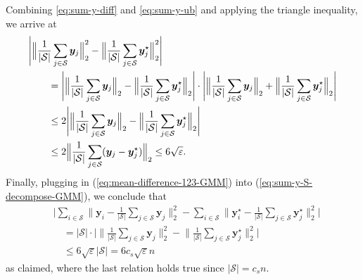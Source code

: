 %
Combining  \eqref{eq:sum-y-diff} and \eqref{eq:sum-y-ub} and applying the triangle inequality, we arrive at
%
\begin{align}
& \Bigg|\Big\|\frac{1}{|\mathcal{S}|}\sum_{j\in\mathcal{S}}\bm{y}_{j}\Big\|_{2}^{2}-\Big\|\frac{1}{|\mathcal{S}|}\sum_{j\in\mathcal{S}}\bm{y}_{j}^{\star}\Big\|_{2}^{2}\Bigg| \notag\\
& \qquad  =\Bigg|\Big\|\frac{1}{|\mathcal{S}|}\sum_{j\in\mathcal{S}}\bm{y}_{j}\Big\|_{2} -\Big\|\frac{1}{|\mathcal{S}|}\sum_{j\in\mathcal{S}}\bm{y}_{j}^{\star}\Big\|_{2} \Bigg|\cdot \Bigg|\Big\|\frac{1}{|\mathcal{S}|}\sum_{j\in\mathcal{S}}\bm{y}_{j}\Big\|_{2} + \Big\|\frac{1}{|\mathcal{S}|}\sum_{j\in\mathcal{S}}\bm{y}_{j}^{\star}\Big\|_{2} \Bigg| \notag\\
& \qquad \leq 2\Bigg|\Big\|\frac{1}{|\mathcal{S}|}\sum_{j\in\mathcal{S}}\bm{y}_{j}\Big\|_{2} -\Big\|\frac{1}{|\mathcal{S}|}\sum_{j\in\mathcal{S}}\bm{y}_{j}^{\star}\Big\|_{2} \Bigg| \notag \\
& \qquad \leq 2 \Big\|\frac{1}{|\mathcal{S}|}\sum_{j\in\mathcal{S}}(\bm{y}_{j}-\bm{y}_{j}^{\star})\Big\|_{2}
  \leq 6\sqrt{\varepsilon}.\label{eq:mean-difference-123-GMM}
\end{align}
Finally, plugging in (\ref{eq:mean-difference-123-GMM})
into (\ref{eq:sum-y-S-decompose-GMM}),
we conclude that
%
\begin{align*}
 & \Bigg| \sum_{i\in\mathcal{S}}\Big\|\bm{y}_{i}-\frac{1}{|\mathcal{S}|}\sum_{j\in\mathcal{S}}\bm{y}_{j}\Big\|_{2}^{2}-\sum_{i\in\mathcal{S}}\Big\|\bm{y}_{i}^{\star}-\frac{1}{|\mathcal{S}|}\sum_{j\in\mathcal{S}}\bm{y}_{j}^{\star}\Big\|_{2}^{2} \Bigg|\\
 & \quad = |\mathcal{S}|
 \cdot\Bigg|\Big\|\frac{1}{|\mathcal{S}|}\sum_{j\in\mathcal{S}}\bm{y}_{j}\Big\|_{2}^{2}-\Big\|\frac{1}{|\mathcal{S}|}\sum_{j\in\mathcal{S}}\bm{y}_{j}^{\star}\Big\|_{2}^{2}  \Bigg|\\
 & \quad\leq   6 \sqrt{\varepsilon}|\mathcal{S}| = 6 c_{s}\sqrt{\varepsilon}n
\end{align*}
%
as claimed, where the last relation holds true since $|\mathcal{S}|=c_s n$.

